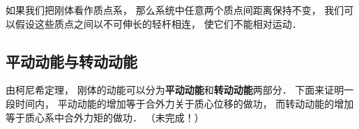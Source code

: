 

如果我们把刚体看作质点系， 那么系统中任意两个质点间距离保持不变， 我们可以假设这些质点之间以不可伸长的轻杆相连， 使它们不能相对运动．

\subsection{平动动能与转动动能}
由柯尼希定理， 刚体的动能可以分为\textbf{平动动能}和\textbf{转动动能}两部分． 下面来证明一段时间内， 平动动能的增加等于合外力关于质心位移的做功， 而转动动能的增加等于质心系中合外力矩的做功．
（未完成！）



